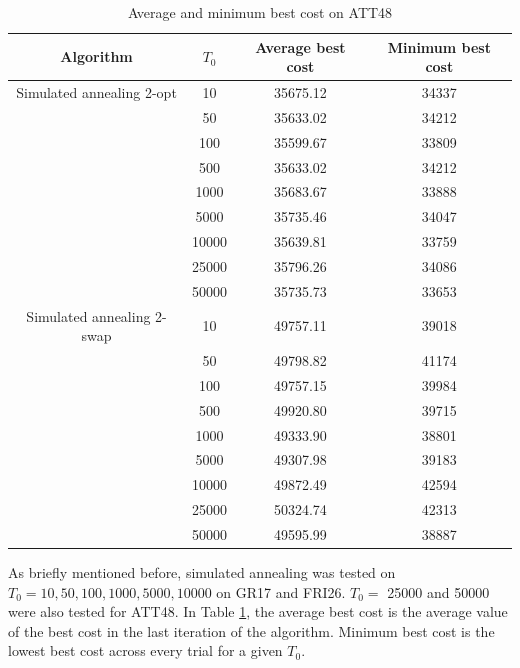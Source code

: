 \begin{table}
    \centering
    \begin{tabular}{|c|c|cc|}
        \hline
        Algorithm & \(T_0\) & Average best cost & Minimum best cost \\
        \hline
        Simulated annealing 2-opt & 10 & 35675.12 & 34337 \\
                                  & 50 & 35633.02 & 34212 \\
                                  & 100 & 35599.67 & 33809 \\
                                  & 500 & 35633.02 & 34212 \\
                                  & 1000 & 35683.67 & 33888 \\
                                  & 5000 & 35735.46 & 34047 \\
                                  & 10000 & 35639.81 & 33759 \\
                                  & 25000 & 35796.26 & 34086 \\
                                  & 50000 & 35735.73 & 33653 \\
        \hline
        Simulated annealing 2-swap & 10 & 49757.11 & 39018 \\
                                   & 50 & 49798.82 & 41174 \\
                                   & 100 & 49757.15 & 39984 \\
                                   & 500 & 49920.80 & 39715 \\
                                   & 1000 & 49333.90 & 38801 \\
                                   & 5000 & 49307.98 & 39183 \\
                                   & 10000 & 49872.49 & 42594 \\
                                   & 25000 & 50324.74 & 42313 \\
                                   & 50000 & 49595.99 & 38887 \\
        \hline
    \end{tabular}
    \caption{Average and minimum best cost on ATT48}
    \label{table:avg-min-att48}
\end{table}

As briefly mentioned before, simulated annealing was tested on \(T_0 = 10, 50, 100, 1000, 5000, 10000\) on GR17 and FRI26. \(T_0 = \) 25000 and 50000 were also tested for ATT48. In Table \ref{table:avg-min-att48}, the average best cost is the average value of the best cost in the last iteration of the algorithm. Minimum best cost is the lowest best cost across every trial for a given \(T_0\).

